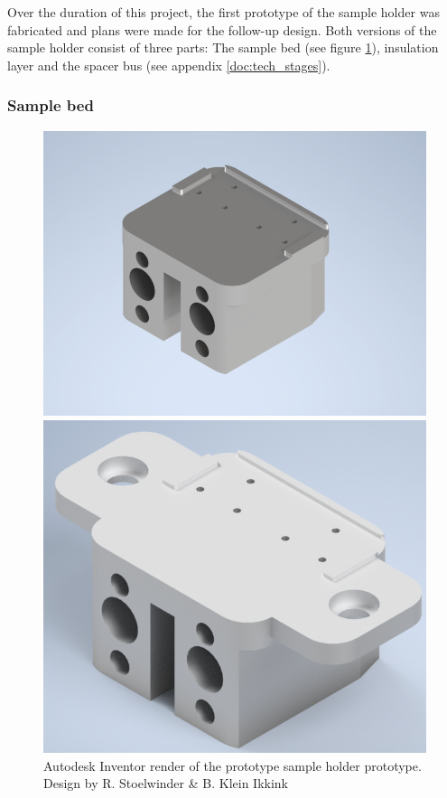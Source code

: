 \documentclass[10pt]{article}
\begin{document}
Over the duration of this project, the first prototype of the sample holder was fabricated and plans were made for the follow-up design. 
Both versions of the sample holder consist of three parts: The sample bed (see figure \ref{fig:prototype_sample_holder}), insulation layer and the spacer bus (see appendix \ref{doc:tech_stages}).\\

\subsubsection{Sample bed}

\begin{figure}[H]
  \centering
  \begin{minipage}[b]{0.45\textwidth}
    \includegraphics[width=1.17\textwidth]{img/sample_holder_and_mask/prototype_sample_block.png}
    \caption{Autodesk Inventor render of the prototype sample holder prototype. Design by R. Stoelwinder \& B. Klein Ikkink}
    \label{fig:prototype_sample_holder}
  \end{minipage}
  \hfill
  \begin{minipage}[b]{0.45\textwidth}
    \includegraphics[width=1\textwidth]{img/sample_holder_and_mask/sample_holder_render_bas.png}

\end{minipage}
\end{figure}
\end{document}
